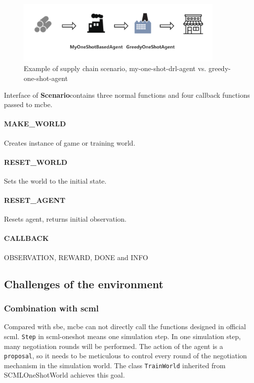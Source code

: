 \begin{figure}[htbp]
\centering
\includegraphics[width=0.9\textwidth]{./images/supply-chain-scenario-1.png}
\caption{Example of supply chain scenario, \gls{my-one-shot-drl-agent} vs. \gls{greedy-one-shot-agent}}
\label{fig:supply-chain-scenario-1}
\end{figure}

Interface of \textbf{Scenario}contains three normal functions and four callback functions passed to \gls{mcbe}.

\paragraph{MAKE\_WORLD} Creates instance of game or training world.
\paragraph{RESET\_WORLD} Sets the world to the initial state.
\paragraph{RESET\_AGENT} Resets agent, returns initial observation.
\paragraph{CALLBACK} OBSERVATION, REWARD, DONE and INFO

\subsection{Challenges of the environment}
\subsubsection{Combination with \gls{scml}}
Compared with \gls{sbe}, \gls{mcbe} can not directly call the functions designed in official \gls{scml}. \texttt{Step} in \gls{scml-oneshot} means one simulation step. In one simulation step, many negotiation rounds will be performed. The action of the agent is a \texttt{proposal}, so it needs to be meticulous to control every round of the negotiation mechanism in the simulation world. The class \texttt{TrainWorld} inherited from SCMLOneShotWorld achieves this goal.
